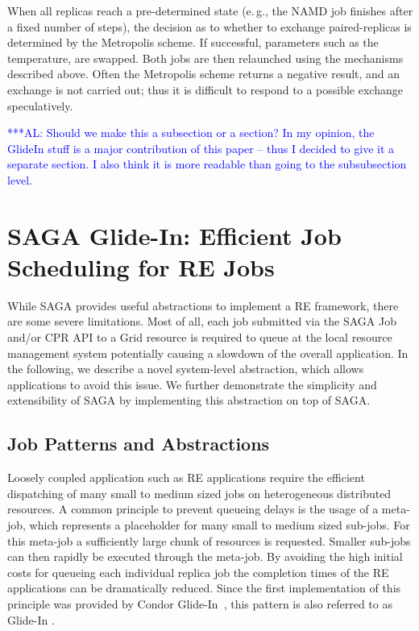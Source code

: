 \documentclass{rspublic}
\newcommand{\alnote}[1]{ {\textcolor{blue} { ***AL: #1 }}}
\newcommand{\jhanote}[1]{ {\textcolor{red} { ***SJ: #1 }}}
\newcommand{\alnote}[1]{}
\newcommand{\jhanote}[1]{}
\newcommand{\glidein}[1]{Glide-In }
\begin{document}
When all replicas reach a pre-determined state (e.\,g., the NAMD job finishes 
after a fixed number of steps), the decision as to whether to exchange
paired-replicas is determined by the Metropolis scheme. If successful,
parameters such as the temperature, are swapped. Both jobs are then
relaunched using the mechanisms described above. Often the Metropolis
scheme returns a negative result, and an exchange is not carried out;
thus it is difficult to respond to a possible exchange speculatively. 
                      
           
\alnote{Should we make this a subsection or a section? In my opinion,
the GlideIn stuff is a major contribution of this paper -- thus I decided to
give it a separate section. I also think it is more readable than going to the
subsubsection level.}           
\section{SAGA Glide-In: Efficient Job Scheduling for RE Jobs}

While SAGA provides useful abstractions to implement a RE framework, there
are some severe limitations. Most of all, each job submitted via the
SAGA Job and/or CPR API to a Grid resource is required to queue at the local 
resource management system potentially causing a slowdown of the overall application. 
In the following, we describe a novel system-level abstraction, which allows 
applications to avoid this issue. We further demonstrate the simplicity and 
extensibility of SAGA by implementing this abstraction on top of SAGA.



\subsection{Job Patterns and Abstractions} 



Loosely coupled application such as RE applications require the efficient
dispatching of many small to medium sized jobs on heterogeneous distributed resources.
A common principle to prevent queueing delays is the usage of a meta-job, which
represents a placeholder for many small to medium sized sub-jobs. For this meta-job a
sufficiently large chunk of resources is requested. Smaller sub-jobs can then rapidly 
be executed through the meta-job.
By avoiding the high initial costs for queueing each individual 
replica job the completion times of the RE applications can be dramatically
reduced. Since the first implementation of this principle was provided by Condor 
Glide-In~\citep{citeulike:291860}, this pattern is also referred to as \glidein\ .
 
\end{document}
